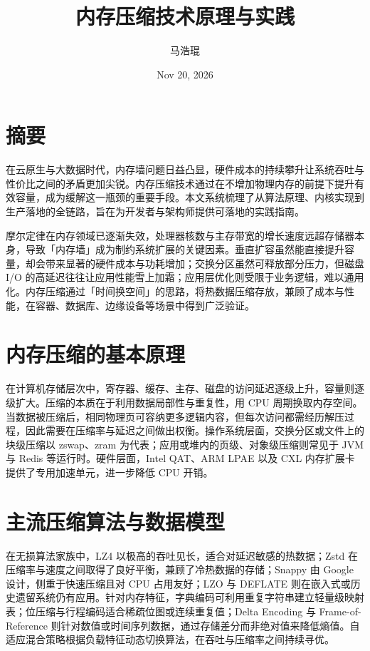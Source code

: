 \title{内存压缩技术原理与实践}
\author{马浩琨}
\date{Nov 20, 2026}
\maketitle
\chapter{摘要}
在云原生与大数据时代，内存墙问题日益凸显，硬件成本的持续攀升让系统吞吐与性价比之间的矛盾更加尖锐。内存压缩技术通过在不增加物理内存的前提下提升有效容量，成为缓解这一瓶颈的重要手段。本文系统梳理了从算法原理、内核实现到生产落地的全链路，旨在为开发者与架构师提供可落地的实践指南。\par
摩尔定律在内存领域已逐渐失效，处理器核数与主存带宽的增长速度远超存储器本身，导致「内存墙」成为制约系统扩展的关键因素。垂直扩容虽然能直接提升容量，却会带来显著的硬件成本与功耗增加；交换分区虽然可释放部分压力，但磁盘 I/O 的高延迟往往让应用性能雪上加霜；应用层优化则受限于业务逻辑，难以通用化。内存压缩通过「时间换空间」的思路，将热数据压缩存放，兼顾了成本与性能，在容器、数据库、边缘设备等场景中得到广泛验证。\par
\chapter{内存压缩的基本原理}
在计算机存储层次中，寄存器、缓存、主存、磁盘的访问延迟逐级上升，容量则逐级扩大。压缩的本质在于利用数据局部性与重复性，用 CPU 周期换取内存空间。当数据被压缩后，相同物理页可容纳更多逻辑内容，但每次访问都需经历解压过程，因此需要在压缩率与延迟之间做出权衡。操作系统层面，交换分区或文件上的块级压缩以 zswap、zram 为代表；应用或堆内的页级、对象级压缩则常见于 JVM 与 Redis 等运行时。硬件层面，Intel QAT、ARM LPAE 以及 CXL 内存扩展卡提供了专用加速单元，进一步降低 CPU 开销。\par
\chapter{主流压缩算法与数据模型}
在无损算法家族中，LZ4 以极高的吞吐见长，适合对延迟敏感的热数据；Zstd 在压缩率与速度之间取得了良好平衡，兼顾了冷热数据的存储；Snappy 由 Google 设计，侧重于快速压缩且对 CPU 占用友好；LZO 与 DEFLATE 则在嵌入式或历史遗留系统仍有应用。针对内存特征，字典编码可利用重复字符串建立轻量级映射表；位压缩与行程编码适合稀疏位图或连续重复值；Delta Encoding 与 Frame-of-Reference 则针对数值或时间序列数据，通过存储差分而非绝对值来降低熵值。自适应混合策略根据负载特征动态切换算法，在吞吐与压缩率之间持续寻优。\par
